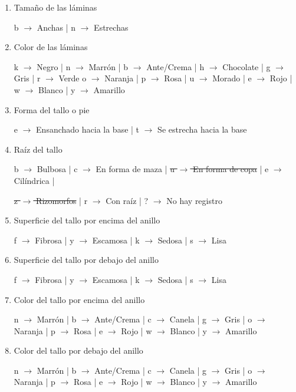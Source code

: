 \documentclass{Plantilla/Formato_EPEF}
\begin{document}
\begin{enumerate}
	\item Tamaño de las láminas
	
	b $\rightarrow$ Anchas | n $\rightarrow$ Estrechas
	
	\item Color de las láminas
	
	k $\rightarrow$ Negro | n $\rightarrow$ Marrón | b $\rightarrow$ Ante/Crema | h $\rightarrow$ Chocolate | g $\rightarrow$ Gris | r $\rightarrow$ Verde o $\rightarrow$ Naranja | p $\rightarrow$ Rosa | u $\rightarrow$ Morado | e $\rightarrow$ Rojo | w $\rightarrow$ Blanco | y $\rightarrow$ Amarillo
	
	\item Forma del tallo o pie
	
	e $\rightarrow$ Ensanchado hacia la base | t $\rightarrow$ Se estrecha hacia la base
	
	\item Raíz del tallo
	
	b $\rightarrow$ Bulbosa | c $\rightarrow$ En forma de maza | \sout{u $\rightarrow$ En forma de copa} | e $\rightarrow$ Cilíndrica | 
	
	\sout{z $\rightarrow$ Rizomorfos} | r $\rightarrow$ Con raíz | ? $\rightarrow$ No hay registro
	
	\item Superficie del tallo por encima del anillo
	
	f $\rightarrow$ Fibrosa | y $\rightarrow$ Escamosa | k $\rightarrow$ Sedosa | s $\rightarrow$ Lisa
	
	\item Superficie del tallo por debajo del anillo
	
	f $\rightarrow$ Fibrosa | y $\rightarrow$ Escamosa | k $\rightarrow$ Sedosa | s $\rightarrow$ Lisa
	
	\item Color del tallo por encima del anillo
	
	n $\rightarrow$ Marrón | b $\rightarrow$ Ante/Crema | c $\rightarrow$ Canela | g $\rightarrow$ Gris | o $\rightarrow$ Naranja |  p $\rightarrow$ Rosa | e $\rightarrow$ Rojo | w $\rightarrow$ Blanco | y $\rightarrow$ Amarillo
	
	\item Color del tallo por debajo del anillo
	
	n $\rightarrow$ Marrón | b $\rightarrow$ Ante/Crema | c $\rightarrow$ Canela | g $\rightarrow$ Gris | o $\rightarrow$ Naranja |  p $\rightarrow$ Rosa | e $\rightarrow$ Rojo | w $\rightarrow$ Blanco | y $\rightarrow$ Amarillo
	

\end{enumerate}
\end{document}
